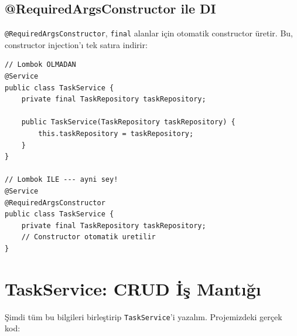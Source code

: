 \documentclass[11pt,a4paper]{article}
\begin{document}
\subsection*{@RequiredArgsConstructor ile DI}

\texttt{@RequiredArgsConstructor}, \texttt{final} alanlar i\c{c}in otomatik constructor \"{u}retir. Bu, constructor injection'{\i} tek sat{\i}ra indirir:

\begin{lstlisting}[style=java]
// Lombok OLMADAN
@Service
public class TaskService {
    private final TaskRepository taskRepository;

    public TaskService(TaskRepository taskRepository) {
        this.taskRepository = taskRepository;
    }
}

// Lombok ILE --- ayni sey!
@Service
@RequiredArgsConstructor
public class TaskService {
    private final TaskRepository taskRepository;
    // Constructor otomatik uretilir
}
\end{lstlisting}

\newpage

\section{TaskService: CRUD \.{I}\c{s} Mant{\i}\u{g}{\i}}

\c{S}imdi t\"{u}m bu bilgileri birle\c{s}tirip \texttt{TaskService}'i yazal{\i}m. Projemizdeki ger\c{c}ek kod:
\end{document}
